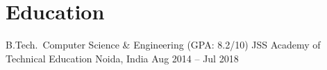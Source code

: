 \documentclass[11pt,a4paper]{moderncv}
\begin{document}
    \section{Education}
    \cventry
    {B.Tech.\, Computer Science \& Engineering (GPA: 8.2/10)}
    {JSS Academy of Technical Education}
    {Noida, India}
    {Aug 2014 -- Jul 2018}
    {}


\end{document}
